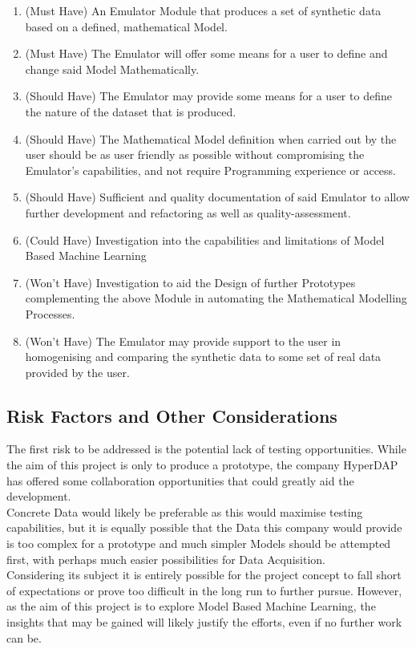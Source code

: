 \documentclass{article}
\begin{document}
    \begin{enumerate}
      \item (Must Have) An Emulator Module that produces a set of synthetic data based on a defined, mathematical Model.
      \item (Must Have) The Emulator will offer some means for a user to define and change said Model Mathematically.
      \item (Should Have) The Emulator may provide some means for a user to define the nature of the dataset that is produced.
      \item (Should Have) The Mathematical Model definition when carried out by the user should be as user friendly as possible without compromising the Emulator's capabilities, and not require Programming experience or access.
      \item (Should Have) Sufficient and quality documentation of said Emulator to allow further development and refactoring as well as quality-assessment.
      \item (Could Have) Investigation into the capabilities and limitations of Model Based Machine Learning
      \item (Won't Have) Investigation to aid the Design of further Prototypes complementing the above Module in automating the Mathematical Modelling Processes.
      \item (Won't Have) The Emulator may provide support to the user in homogenising and comparing the synthetic data to some set of real data provided by the user.
    \end{enumerate}

  \subsection{Risk Factors and Other Considerations}

The first risk to be addressed is the potential lack of testing opportunities. While the aim of this project is only to produce a prototype, the company HyperDAP has offered some collaboration opportunities that could greatly aid the development.
\\ Concrete Data would likely be preferable as this would maximise testing capabilities, but it is equally possible that the Data this company would provide is too complex for a prototype and much simpler Models should be attempted first, with perhaps much easier possibilities for Data Acquisition.
\\ Considering its subject it is entirely possible for the project concept to fall short of expectations or prove too difficult in the long run to further pursue. However, as the aim of this project is to explore Model Based Machine Learning, the insights that may be gained will likely justify the efforts, even if no further work can be.
\end{document}
